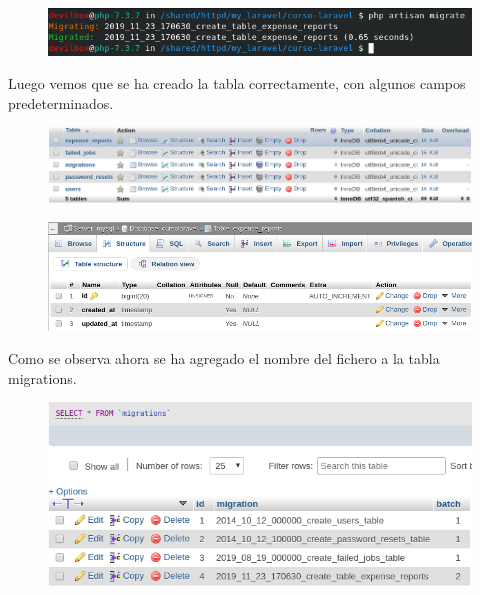 \documentclass{article}
\begin{document}
\begin{figure}[h!]
  \centering
  \includegraphics[scale=0.5]{./Pictures/028_migrate.png}
\end{figure}

Luego vemos que se ha creado la tabla correctamente, con algunos campos
predeterminados.\\

\begin{figure}[h!]
  \centering
  \includegraphics[scale=0.5]{./Pictures/029_table_created.png}
\end{figure}

\begin{figure}[h!]
  \centering
  \includegraphics[scale=0.5]{./Pictures/030_expense_reports.png}
\end{figure}

Como se observa ahora se ha agregado el nombre del fichero a la tabla
migrations.

\begin{figure}[h!]
  \centering
  \includegraphics[scale=0.5]{./Pictures/031_migrations_table.png}
\end{figure}
\end{document}
